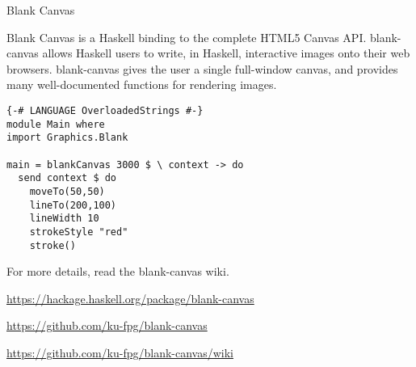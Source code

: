 \begin{hcarentry}{Blank Canvas}
\label{BlankCanvas}
\makeheader

Blank Canvas is a Haskell binding to the complete HTML5 Canvas API.
blank-canvas allows Haskell users to write, in Haskell, interactive images
onto their web browsers. blank-canvas gives the user a single full-window
canvas, and provides many well-documented functions for rendering images.

\begin{verbatim}
{-# LANGUAGE OverloadedStrings #-}
module Main where
import Graphics.Blank

main = blankCanvas 3000 $ \ context -> do
  send context $ do                      
    moveTo(50,50)
    lineTo(200,100)
    lineWidth 10
    strokeStyle "red"
    stroke()                             
\end{verbatim}

For more details, read the blank-canvas wiki.

\FurtherReading
\begin{compactitem}
\item
  \url{https://hackage.haskell.org/package/blank-canvas}
\item
  \url{https://github.com/ku-fpg/blank-canvas}
\item
  \url{https://github.com/ku-fpg/blank-canvas/wiki}
\end{compactitem}
\end{hcarentry}
